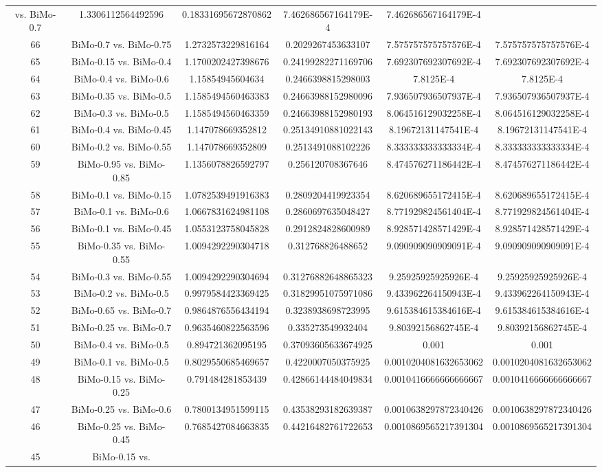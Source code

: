 \documentclass[a4paper,10pt]{article}
\begin{document}
\begin{landscape}
\begin{table}[!htp]
\begin{tabular}{cccccc}
vs. BiMo-0.7&1.3306112564492596&0.18331695672870862&7.462686567164179E-4&7.462686567164179E-4\\66&BiMo-0.7 vs. BiMo-0.75&1.2732573229816164&0.2029267453633107&7.575757575757576E-4&7.575757575757576E-4\\65&BiMo-0.15 vs. BiMo-0.4&1.1700202427398676&0.24199282271169706&7.692307692307692E-4&7.692307692307692E-4\\64&BiMo-0.4 vs. BiMo-0.6&1.15854945604634&0.2466398815298003&7.8125E-4&7.8125E-4\\63&BiMo-0.35 vs. BiMo-0.5&1.1585494560463383&0.24663988152980096&7.936507936507937E-4&7.936507936507937E-4\\62&BiMo-0.3 vs. BiMo-0.5&1.1585494560463359&0.24663988152980193&8.064516129032258E-4&8.064516129032258E-4\\61&BiMo-0.4 vs. BiMo-0.45&1.147078669352812&0.25134910881022143&8.19672131147541E-4&8.19672131147541E-4\\60&BiMo-0.2 vs. BiMo-0.55&1.147078669352809&0.2513491088102226&8.333333333333334E-4&8.333333333333334E-4\\59&BiMo-0.95 vs. BiMo-0.85&1.1356078826592797&0.256120708367646&8.474576271186442E-4&8.474576271186442E-4\\58&BiMo-0.1 vs. BiMo-0.15&1.0782539491916383&0.2809204419923354&8.620689655172415E-4&8.620689655172415E-4\\57&BiMo-0.1 vs. BiMo-0.6&1.0667831624981108&0.2860697635048427&8.771929824561404E-4&8.771929824561404E-4\\56&BiMo-0.1 vs. BiMo-0.45&1.0553123758045828&0.2912824828600989&8.928571428571429E-4&8.928571428571429E-4\\55&BiMo-0.35 vs. BiMo-0.55&1.0094292290304718&0.312768826488652&9.090909090909091E-4&9.090909090909091E-4\\54&BiMo-0.3 vs. BiMo-0.55&1.0094292290304694&0.31276882648865323&9.25925925925926E-4&9.25925925925926E-4\\53&BiMo-0.2 vs. BiMo-0.5&0.9979584423369425&0.31829951075971086&9.433962264150943E-4&9.433962264150943E-4\\52&BiMo-0.65 vs. BiMo-0.7&0.9864876556434194&0.3238938698723995&9.615384615384616E-4&9.615384615384616E-4\\51&BiMo-0.25 vs. BiMo-0.7&0.9635460822563596&0.335273549932404&9.80392156862745E-4&9.80392156862745E-4\\50&BiMo-0.4 vs. BiMo-0.5&0.894721362095195&0.37093605633674925&0.001&0.001\\49&BiMo-0.1 vs. BiMo-0.5&0.8029550685469657&0.4220007050375925&0.0010204081632653062&0.0010204081632653062\\48&BiMo-0.15 vs. BiMo-0.25&0.791484281853439&0.42866144484049834&0.0010416666666666667&0.0010416666666666667\\47&BiMo-0.25 vs. BiMo-0.6&0.7800134951599115&0.43538293182639387&0.0010638297872340426&0.0010638297872340426\\46&BiMo-0.25 vs. BiMo-0.45&0.7685427084663835&0.44216482761722653&0.0010869565217391304&0.0010869565217391304\\45&BiMo-0.15 vs. 
\end{tabular}
\end{table}
\end{landscape}
\end{document}
